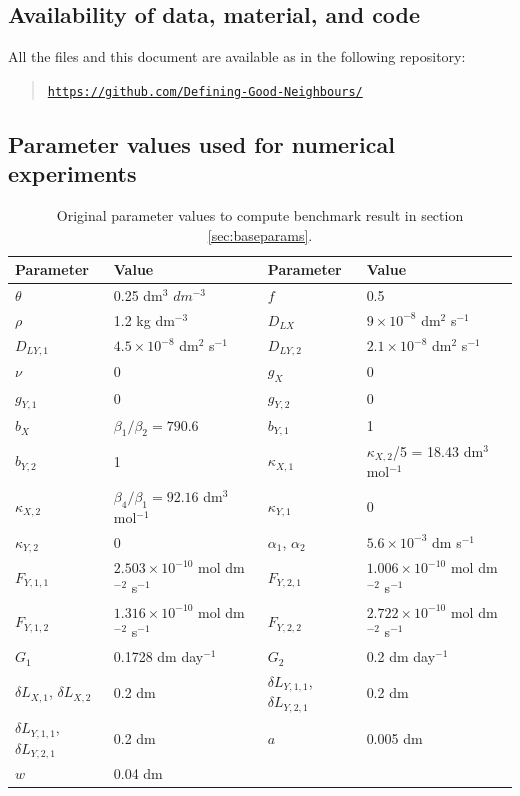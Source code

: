 \documentclass[11pt]{article}
\numberwithin{equation}{section}
\begin{document}
\subsection{Availability of data, material, and code}
\label{app:one}
All the files and this document are available as in the following repository:
\begin{quote}
    \noindent \href{https://github.com/Defining-Good-Neighbours/}{\texttt{https://github.com/Defining-Good-Neighbours/}}
\end{quote}

\subsection{Parameter values used for numerical experiments}
\begin{table}[h]
\begin{center}

\fontsize{9.5}{7}\selectfont
\setlength{\tabcolsep}{5.pt}
\def\arraystretch{2.0}
\begin{tabular}{ll|ll}
\toprule
  \textbf{Parameter} & \textbf{Value} & \textbf{Parameter} & \textbf{Value}  \\
 \hline 
$\theta$ & 0.25 dm$^3$ $dm^{-3}$ & $f$ & 0.5 \\
$\rho$ & 1.2 kg dm$^{-3}$ & $D_{LX}$ & $9 \times 10^{-8}$ dm$^2$ s$^{-1}$\\
$D_{LY,1}$  & $4.5 \times 10^{-8}$ dm$^2$ s$^{-1}$ & $D_{LY,2}$ & $2.1 \times 10^{-8}$ dm$^2$ s$^{-1}$ \\
$\nu$ & 0 & $g_X$ & 0 \\
$g_{Y,1}$ & 0 & $g_{Y,2}$ & 0 \\
$b_X$ & $\beta_1 / \beta_2 = 790.6$ & $b_{Y,1}$ & 1 \\
$b_{Y,2}$ & 1 & $\kappa_{X,1}$ & $\kappa_{X,2}$/5 = 18.43 dm$^3$ mol$^{-1}$ \\
$\kappa_{X,2}$ & $\beta_4 / \beta_1 = 92.16$ dm$^3$ mol$^{-1}$ & $\kappa_{Y,1}$ & 0 \\
$\kappa_{Y,2}$ & 0 & $\alpha_1$, $\alpha_2$ & $5.6 \times 10^{-3}$ dm s$^{-1}$\\
$F_{Y,1,1}$ & $2.503 \times 10^{-10}$ mol dm$^{-2}$ s$^{-1}$ & $F_{Y,2,1}$ & $1.006 \times 10^{-10}$  mol dm$^{-2}$ s$^{-1}$ \\
$F_{Y,1,2}$ & $1.316 \times 10^{-10}$ mol dm$^{-2}$ s$^{-1}$ & $F_{Y,2,2}$ & $2.722 \times 10^{-10}$  mol dm$^{-2}$ s$^{-1}$\\
$G_1$ & 0.1728 dm day$^{-1}$ & $G_2$ & 0.2 dm day$^{-1}$ \\
$\delta L_{X,1}$, $\delta L_{X,2}$ & 0.2 dm & $\delta L_{Y,1,1}$, $\delta L_{Y,2,1}$ & 0.2 dm \\
$\delta L_{Y,1,1}$, $\delta L_{Y,2,1}$ & 0.2 dm & $a$ & 0.005 dm \\
$w$ & 0.04 dm & & \\
\bottomrule
\end{tabular}
\caption{Original parameter values to compute benchmark result in section \ref{sec:baseparams}. \label{t:baseparams}}

\end{center}
\end{table}
\end{document}
